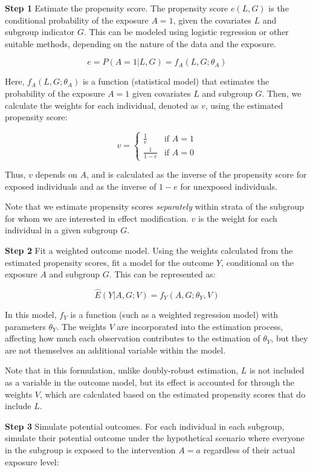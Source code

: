 \documentclass[
  singlecolumn]{article}
\begin{document}
\textbf{Step 1} Estimate the propensity score. The propensity score
\(e(L, G)\) is the conditional probability of the exposure \(A = 1\),
given the covariates \(L\) and subgroup indicator \(G\). This can be
modeled using logistic regression or other suitable methods, depending
on the nature of the data and the exposure.

\[e = P(A = 1 | L, G) = f_A(L, G; \theta_A)\]

Here, \(f_A(L, G; \theta_A)\) is a function (statistical model) that
estimates the probability of the exposure \(A = 1\) given covariates
\(L\) and subgroup \(G\). Then, we calculate the weights for each
individual, denoted as \(v\), using the estimated propensity score:

\[
v = 
\begin{cases} 
\frac{1}{e} & \text{if } A = 1 \\
\frac{1}{1-e} & \text{if } A = 0 
\end{cases}
\]

Thus, \(v\) depends on \(A\), and is calculated as the inverse of the
propensity score for exposed individuals and as the inverse of \(1-e\)
for unexposed individuals.

Note that we estimate propensity scores \emph{separately} within strata
of the subgroup for whom we are interested in effect modification. \(v\)
is the weight for each individual in a given subgroup \(G\).

\textbf{Step 2} Fit a weighted outcome model. Using the weights
calculated from the estimated propensity scores, fit a model for the
outcome \(Y\), conditional on the exposure \(A\) and subgroup \(G\).
This can be represented as:

\[ \hat{E}(Y|A, G; V) = f_Y(A, G ; \theta_Y, V) \]

In this model, \(f_Y\) is a function (such as a weighted regression
model) with parameters \(θ_Y\). The weights \(V\) are incorporated into
the estimation process, affecting how much each observation contributes
to the estimation of \(θ_Y\), but they are not themselves an additional
variable within the model.

Note that in this formulation, unlike doubly-robust estimation, \(L\) is
not included as a variable in the outcome model, but its effect is
accounted for through the weights \(V\), which are calculated based on
the estimated propensity scores that do include \(L\).

\textbf{Step 3} Simulate potential outcomes. For each individual in each
subgroup, simulate their potential outcome under the hypothetical
scenario where everyone in the subgroup is exposed to the intervention
\(A=a\) regardless of their actual exposure level:
\end{document}
